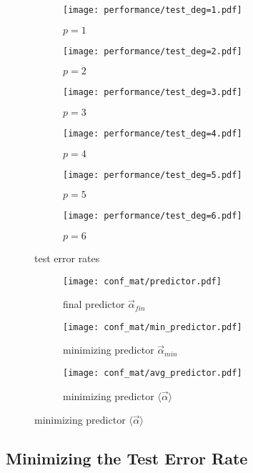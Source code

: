 \begin{figure}[h!]
    \begin{subfigure}[t]{0.49\textwidth}
        \centering
        \texttt{[image: performance/test\_deg=1.pdf]} 
        \caption{$p = 1$}
    \end{subfigure}
    \hfill
    \begin{subfigure}[t]{0.49\textwidth}
        \centering
        \texttt{[image: performance/test\_deg=2.pdf]} 
        \caption{$p = 2$}
    \end{subfigure}
    \par\bigskip
        \begin{subfigure}[t]{0.49\textwidth}
        \centering
        \texttt{[image: performance/test\_deg=3.pdf]} 
        \caption{$p = 3$}
    \end{subfigure}
    \hfill
    \begin{subfigure}[t]{0.49\textwidth}
        \centering
        \texttt{[image: performance/test\_deg=4.pdf]} 
        \caption{$p = 4$}
    \end{subfigure}
    \par\bigskip
        \begin{subfigure}[t]{0.49\textwidth}
        \centering
        \texttt{[image: performance/test\_deg=5.pdf]} 
        \caption{$p = 5$}
    \end{subfigure}
    \hfill
    \begin{subfigure}[t]{0.49\textwidth}
        \centering
        \texttt{[image: performance/test\_deg=6.pdf]} 
        \caption{$p = 6$}
    \end{subfigure}
    \caption{test error rates}
\end{figure}

\begin{figure}
\centering
	\begin{subfigure}[t]{0.49\textwidth}
	\centering
		\texttt{[image: conf\_mat/predictor.pdf]} 
		\caption{final predictor $\vec{\alpha}_{fin}$}
	\end{subfigure}
	\hfill
	\begin{subfigure}[t]{0.49\textwidth}
	\centering
		\texttt{[image: conf\_mat/min\_predictor.pdf]} 
		\caption{minimizing predictor $\vec{\alpha}_{min}$}
	\end{subfigure}
		\begin{subfigure}[t]{0.49\textwidth}
	\centering
		\texttt{[image: conf\_mat/avg\_predictor.pdf]} 
		\caption{minimizing predictor $\langle\vec{\alpha}\rangle$}
	\end{subfigure}
\end{figure}

\subsection{Minimizing the Test Error Rate}\label{subsec:best_pred}
